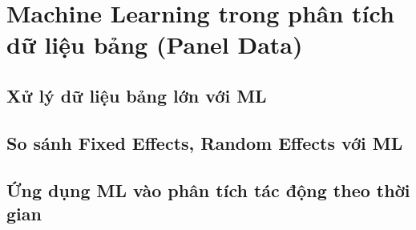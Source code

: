 \chapter{Machine Learning trong phân tích dữ liệu bảng (Panel Data)}
\section{Xử lý dữ liệu bảng lớn với ML}
\section{So sánh Fixed Effects, Random Effects với ML}
\section{Ứng dụng ML vào phân tích tác động theo thời gian}